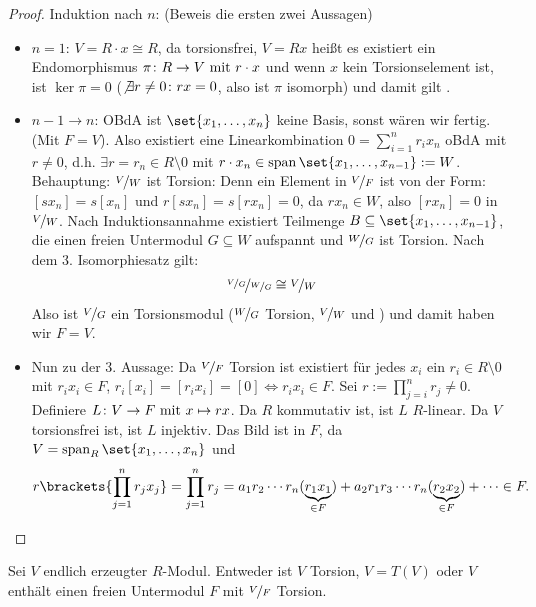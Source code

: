 \begin{proof}
	Induktion nach $n$: (Beweis die ersten zwei Aussagen)
	\begin{itemize}
		\item $n=1$: $V = R\cdot x \cong R$, da torsionsfrei, $V = Rx$ heißt es existiert ein Endomorphismus $\pi\colon R \to V \mit r \cdot x$ und wenn $x$ kein Torsionselement ist, ist $\ker \pi = 0$ ($\not \exists r \neq 0 \colon rx = 0$, also ist $\pi$ isomorph) und damit gilt .
		\item $n-1 \to n$: OBdA ist $\set{x_1, \dots, x_n}$ keine Basis, sonst wären wir fertig. (Mit $F = V$). Also existiert eine Linearkombination $0 = \sum_{i=1}^n r_i x_n$ oBdA mit $r \neq 0$, d.h. $\exists r = r_n \in R \setminus{0}$ mit $r\cdot x_n \in \Span\set{x_1, \dots, x_{n-1}} := W$.\\
		Behauptung: $\lnkset{V}{W}$ ist Torsion: Denn ein Element in $\lnkset{V}{F}$ ist von der Form: $[s x_n] = s[x_n]$ und $r[s x_n] = s[r x_n] = 0$, da $r x_n \in W$, also $[r x_n] = 0$ in $\lnkset{V}{W}$. Nach Induktionsannahme existiert Teilmenge $B \subseteq \set{x_1, \dots, x_{n-1}}$, die einen freien Untermodul $G \subseteq W$ aufspannt und $\lnkset{W}{G}$ ist Torsion. Nach dem 3. Isomorphiesatz gilt:
		\begin{align*}
			\lnkset{\lnkset{V}{G}}{\lnkset{W}{G}} \cong \lnkset{V}{W}
		\end{align*}
		Also ist $\lnkset{V}{G}$ ein Torsionsmodul ($\lnkset{W}{G}$ Torsion, $\lnkset{V}{W}$ und ) und damit haben wir $F = V$.
		\item Nun zu der 3. Aussage: Da $\lnkset{V}{F}$ Torsion ist existiert für jedes $x_i$ ein $r_i \in R\setminus{0}$ mit $r_i x_i \in F$, $r_i[x_i] = [r_i x_i] = [0] \Leftrightarrow r_i x_i \in F$. Sei $r := \prod_{j=i}^n r_j \neq 0$. Definiere $L\colon V \to F \mit x \mapsto rx$. Da $R$ kommutativ ist, ist $L$ $R$-linear. Da $V$ torsionsfrei ist, ist $L$ injektiv. Das Bild ist in $F$, da $V = \Span_R\set{x_1, \dots, x_n}$ und
		\begin{align*}
			r\brackets{\prod_{j=1}^n r_j x_j} = \prod_{j=1}^n r_j = a_1 r_2\cdots r_n (\underbrace{r_1 x_1}_{\in F}) + a_2 r_1 r_3 \cdots r_n(\underbrace{r_2 x_2}_{\in F}) + \dots \in F.
		\end{align*}
	\end{itemize}
\end{proof}
\begin{conclusion}
	Sei $V$ endlich erzeugter $R$-Modul. Entweder ist $V$ Torsion, $V = T(V)$ oder $V$ enthält einen freien Untermodul $F$ mit $\lnkset{V}{F}$ Torsion.
\end{conclusion}
